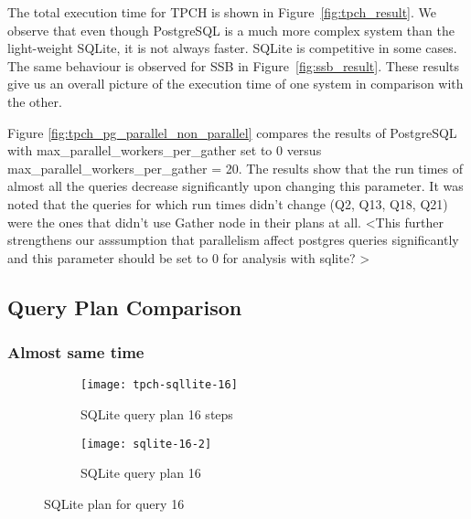 The total execution time for TPCH is shown in Figure~\ref{fig:tpch_result}. We observe that even though PostgreSQL is a much more complex system than the light-weight SQLite, it is not always faster. SQLite is competitive in some cases. The same behaviour is observed for SSB in Figure~\ref{fig:ssb_result}. These results give us an overall picture of the execution time of one system in comparison with the other.

Figure \ref{fig:tpch_pg_parallel_non_parallel} compares the results of PostgreSQL with  {max\_parallel\_workers\_per\_gather} set to 0 versus {max\_parallel\_workers\_per\_gather} = 20. The results show that the run times of almost all the queries decrease significantly upon changing this parameter. It was noted that the queries for which run times didn't change (Q2, Q13, Q18, Q21) were the ones that didn't use Gather node in their plans at all. <This further strengthens our asssumption that parallelism affect postgres queries significantly and this parameter should be set to 0 for analysis with sqlite? >



\subsection{Query Plan Comparison}
\label{sec:plan}

\subsubsection{Almost same time}

\begin{figure*}[ht]
\centering
     \begin{subfigure}[b]{0.4\textwidth}
         \centering
         \texttt{[image: tpch-sqllite-16]}
         \caption{SQLite query plan 16 steps}
         \label{fig:tpch-sqllite-16}
     \end{subfigure}
     \hfill
     \begin{subfigure}[b]{0.4\textwidth}
         \centering
         \texttt{[image: sqlite-16-2]}
         \caption{SQLite query plan 16}
         \label{fig:sqlite-16-2}
     \end{subfigure}

        \caption{SQLite plan for query 16}
        \label{fig:sqlite-16}
\end{figure*}

